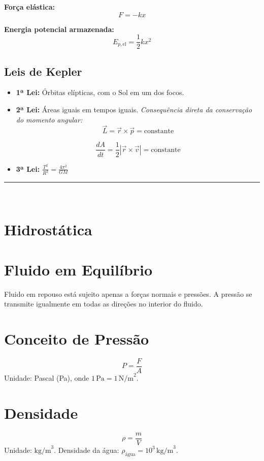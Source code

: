 \documentclass[a4paper,12pt]{article}
\begin{document}
\begin{multicols}{2}
\textbf{Força elástica:}
\begin{equation*}
  F = -k x
\end{equation*}

\textbf{Energia potencial armazenada:}
\begin{equation*}
  E_{p,\text{el}} = \frac{1}{2} k x^2
\end{equation*}

\subsection{Leis de Kepler}

\begin{itemize}
  \item \textbf{1ª Lei:} Órbitas elípticas, com o Sol em um dos focos.
  \item \textbf{2ª Lei:} Áreas iguais em tempos iguais. \textit{Consequência direta da 
  conservação do momento angular:}
        \[
        \vec{L} = \vec{r} \times \vec{p} = \text{constante}
        \]

        \[ \frac{dA}{dt} = \frac{1}{2} |\vec{r} \times \vec{v}| = \text{constante} \]

  \item \textbf{3ª Lei:} \( \frac{T^2}{R^3} = \frac{4 \pi^2}{GM}  \)
\end{itemize}

\noindent\rule{\linewidth}{1pt}\\
\section{Hidrostática}

\section{Fluido em Equilíbrio}
Fluido em repouso está sujeito apenas a forças normais e pressões. A pressão se transmite igualmente em todas as direções no interior do fluido.

\section{Conceito de Pressão}
\[
P = \frac{F}{A}
\]
Unidade: Pascal (Pa), onde \(1\, \text{Pa} = 1\, \text{N/m}^2\).

\section{Densidade}
\[
\rho = \frac{m}{V}
\]
Unidade: \(\text{kg/m}^3\). Densidade da água: \(\rho_{\text{água}} = 10^3\, \text{kg/m}^3\).


\end{multicols}
\end{document}
